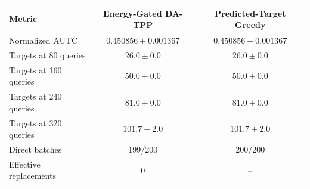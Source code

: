 \begin{tabular}{lcc}
\toprule
Metric & Energy-Gated DA-TPP & Predicted-Target Greedy \\
\midrule
Normalized AUTC & $0.450856 \pm 0.001367$ & $0.450856 \pm 0.001367$ \\
Targets at 80 queries & $26.0 \pm 0.0$ & $26.0 \pm 0.0$ \\
Targets at 160 queries & $50.0 \pm 0.0$ & $50.0 \pm 0.0$ \\
Targets at 240 queries & $81.0 \pm 0.0$ & $81.0 \pm 0.0$ \\
Targets at 320 queries & $101.7 \pm 2.0$ & $101.7 \pm 2.0$ \\
Direct batches & 199/200 & 200/200 \\
Effective replacements & 0 & -- \\
\bottomrule
\end{tabular}
